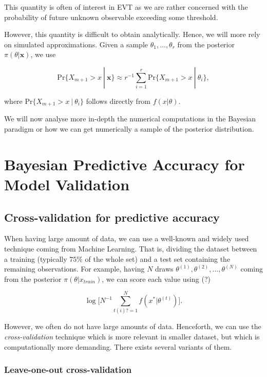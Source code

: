 \documentclass[11pt,a4paper,openany ]{book}
\begin{document}
This quantity is often of interest in EVT as we are rather concerned with the probability of future unknown observable exceeding some threshold.

However, this quantity is difficult to obtain analytically. Hence, we will more rely on simulated approximations. Given a sample $\theta_1,\dots,\theta_r$ from the posterior $\pi(\theta|\boldsymbol{x})$, we use 

\begin{equation}
\text{Pr}\{X_{m+1}>x\ | \ \boldsymbol{x}\}\approx r^{-1}\sum_{i=1}^r\text{Pr}\{X_{m+1}>x \ | \ \theta_i\},
\end{equation}

where $\text{Pr}\{X_{m+1}>x \ | \ \theta_i\}$ follows directly from $f(x|\theta)$. 

We will now analyse more in-depth the numerical computations in the Bayesian paradigm or how we can get numerically a sample of the posterior distribution.



\section{Bayesian Predictive Accuracy for Model Validation}

\subsection{Cross-validation for predictive accuracy}

When having large amount of data, we can use a well-known and widely used technique coming from Machine Learning. That is, dividing the dataset between a training (typically $75\%$ of the whole set) and a test set containing the remaining observations.
For example, having $N$ draws $\theta^{(1)},\theta^{(2)},\dots,\theta^{(N)}$ coming from the posterior $\pi(\theta|x_{train})$, we can score each value using (?)


\begin{equation}
\log\bigg[N^{-1}\sum_{t(i)?=1}^N f(x^*|\theta^{(t)})\bigg].
\end{equation}

However, we often do not have large amounts of data. Henceforth, we can use the \emph{cross-validation} technique which is more relevant in smaller dataset, but which is computationally more demanding. There exists several variants of them. 

\subsubsection*{Leave-one-out cross-validation}
\end{document}
